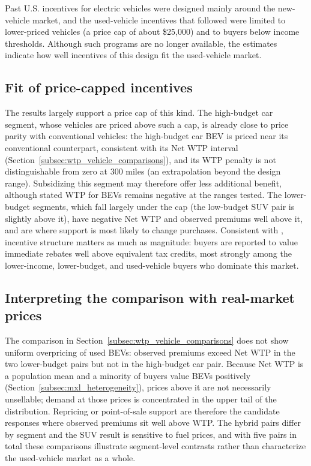 \documentclass[a4paper,fleqn]{cas-sc}   %
\begin{document}
Past U.S. incentives for electric vehicles were designed mainly around the new-vehicle market, and the used-vehicle incentives that followed were limited to lower-priced vehicles (a price cap of about \$25,000) and to buyers below income thresholds. Although such programs are no longer available, the estimates indicate how well incentives of this design fit the used-vehicle market.

\subsection{Fit of price-capped incentives}

The results largely support a price cap of this kind. The high-budget car segment, whose vehicles are priced above such a cap, is already close to price parity with conventional vehicles: the high-budget car BEV is priced near its conventional counterpart, consistent with its Net WTP interval (Section~\ref{subsec:wtp_vehicle_comparisons}), and its WTP penalty is not distinguishable from zero at 300 miles (an extrapolation beyond the design range). Subsidizing this segment may therefore offer less additional benefit, although stated WTP for BEVs remains negative at the ranges tested. The lower-budget segments, which fall largely under the cap (the low-budget SUV pair is slightly above it), have negative Net WTP and observed premiums well above it, and are where support is most likely to change purchases. Consistent with \textcite{robersonNotAllSubsidies2022}, incentive structure matters as much as magnitude: buyers are reported to value immediate rebates well above equivalent tax credits, most strongly among the lower-income, lower-budget, and used-vehicle buyers who dominate this market.

\subsection{Interpreting the comparison with real-market prices}

The comparison in Section~\ref{subsec:wtp_vehicle_comparisons} does not show uniform overpricing of used BEVs: observed premiums exceed Net WTP in the two lower-budget pairs but not in the high-budget car pair. Because Net WTP is a population mean and a minority of buyers value BEVs positively (Section~\ref{subsec:mxl_heterogeneity}), prices above it are not necessarily unsellable; demand at those prices is concentrated in the upper tail of the distribution. Repricing or point-of-sale support are therefore the candidate responses where observed premiums sit well above WTP. The hybrid pairs differ by segment and the SUV result is sensitive to fuel prices, and with five pairs in total these comparisons illustrate segment-level contrasts rather than characterize the used-vehicle market as a whole.
\end{document}
